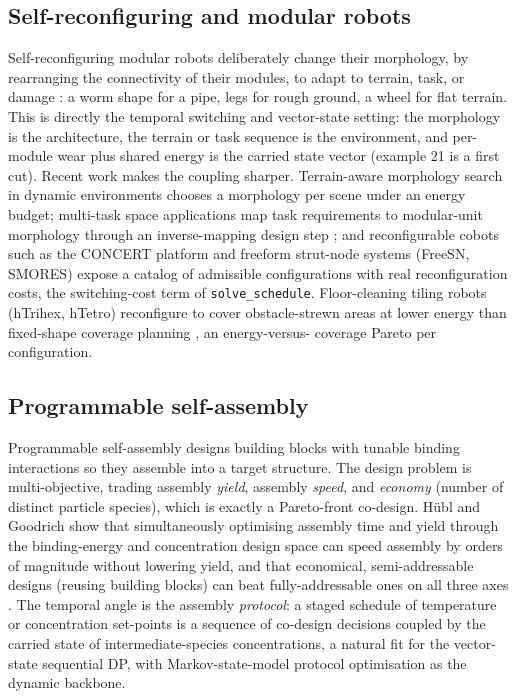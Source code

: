 \documentclass[11pt,a4paper]{article}
\begin{document}
\subsection{Self-reconfiguring and modular robots}

Self-reconfiguring modular robots deliberately change their morphology, by
rearranging the connectivity of their modules, to adapt to terrain, task,
or damage \citep{modularrobots2024overview}: a worm shape for a pipe, legs
for rough ground, a wheel
for flat terrain. This is directly the temporal switching and vector-state
setting: the morphology is the architecture, the terrain or task sequence
is the environment, and per-module wear plus shared energy is the carried
state vector (example 21 is a first cut). Recent work makes the coupling
sharper. Terrain-aware morphology search in dynamic
environments \citep{liu2026terrain}
chooses a morphology per scene under an energy budget; multi-task space
applications map task requirements to modular-unit morphology through an
inverse-mapping design step \citep{an2025morphological}; and reconfigurable
cobots such as the
CONCERT platform and freeform strut-node systems (FreeSN, SMORES) expose a
catalog of admissible configurations with real reconfiguration costs, the
switching-cost term of \texttt{solve\_schedule}. Floor-cleaning tiling
robots (hTrihex, hTetro) reconfigure to cover obstacle-strewn areas at
lower energy than fixed-shape coverage planning \citep{actuators2023modular},
an energy-versus-
coverage Pareto per configuration.

\subsection{Programmable self-assembly}

Programmable self-assembly designs building blocks with tunable binding
interactions so they assemble into a target structure. The design problem
is multi-objective, trading assembly \emph{yield}, assembly \emph{speed},
and \emph{economy} (number of distinct particle species), which is exactly
a Pareto-front co-design. H\"ubl and Goodrich show that simultaneously
optimising assembly time and yield through the binding-energy and
concentration design space can speed assembly by orders of magnitude
without lowering yield, and that economical, semi-addressable designs
(reusing building blocks) can beat fully-addressable ones on all three
axes \citep{hubl2026simultaneous,hubl2025accessing}. The temporal angle is the
assembly \emph{protocol}: a
staged schedule of temperature or concentration set-points is a sequence of
co-design decisions coupled by the carried state of intermediate-species
concentrations, a natural fit for the vector-state sequential DP, with
Markov-state-model protocol optimisation \citep{markov2022selfassembly} as the
dynamic backbone.
\end{document}
